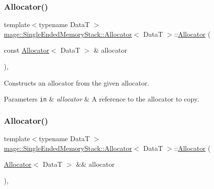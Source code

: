 \subsubsection{\texorpdfstring{Allocator()}{Allocator()}\hspace{0.1cm}{\footnotesize\ttfamily [1/4]}}
{\footnotesize\ttfamily template$<$typename DataT $>$ \\
\hyperlink{structmage_1_1_single_ended_memory_stack_1_1_allocator}{mage\+::\+Single\+Ended\+Memory\+Stack\+::\+Allocator}$<$ DataT $>$\+::\hyperlink{structmage_1_1_single_ended_memory_stack_1_1_allocator}{Allocator} (\begin{DoxyParamCaption}\item[{const \hyperlink{structmage_1_1_single_ended_memory_stack_1_1_allocator}{Allocator}$<$ DataT $>$ \&}]{allocator }\end{DoxyParamCaption})\hspace{0.3cm}{\ttfamily [default]}, {\ttfamily [noexcept]}}

Constructs an allocator from the given allocator.


\begin{DoxyParams}[1]{Parameters}
\mbox{\tt in}  & {\em allocator} & A reference to the allocator to copy. \\
\hline
\end{DoxyParams}
\hypertarget{structmage_1_1_single_ended_memory_stack_1_1_allocator_a445eaee8e10d872886de2f4194ecca72}{}\label{structmage_1_1_single_ended_memory_stack_1_1_allocator_a445eaee8e10d872886de2f4194ecca72} 
\subsubsection{\texorpdfstring{Allocator()}{Allocator()}\hspace{0.1cm}{\footnotesize\ttfamily [2/4]}}
{\footnotesize\ttfamily template$<$typename DataT $>$ \\
\hyperlink{structmage_1_1_single_ended_memory_stack_1_1_allocator}{mage\+::\+Single\+Ended\+Memory\+Stack\+::\+Allocator}$<$ DataT $>$\+::\hyperlink{structmage_1_1_single_ended_memory_stack_1_1_allocator}{Allocator} (\begin{DoxyParamCaption}\item[{\hyperlink{structmage_1_1_single_ended_memory_stack_1_1_allocator}{Allocator}$<$ DataT $>$ \&\&}]{allocator }\end{DoxyParamCaption})\hspace{0.3cm}{\ttfamily [default]}, {\ttfamily [noexcept]}}

